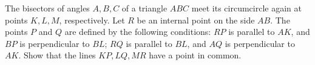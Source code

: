 The bisectors of angles $A, B, C$ of a triangle $ABC$ meet its circumcircle again at points $K, L, M$, respectively. Let $R$ be an internal point on the side $AB$. The points $P$ and $Q$ are defined by the following conditions: $RP$ is parallel to $AK$, and $BP$ is perpendicular to $BL$; $RQ$ is parallel to $BL$, and $AQ$ is perpendicular to $AK$. Show that the lines $KP, LQ, MR$ have a point in common.
